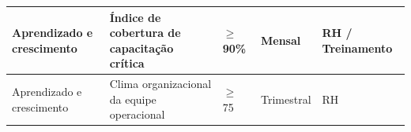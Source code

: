 \begin{table}[htbp]
\begin{tabular}{|p{3cm}|p{3cm}|p{2cm}|p{2cm}|p{3cm}|}
 \hline                                                                         
 Aprendizado e crescimento & Índice de cobertura de capacitação crítica &       
 $\geq$ 90\% & Mensal & RH / Treinamento \\                                       
 \hline                                                                         
 Aprendizado e crescimento & Clima organizacional da equipe operacional &       
 $\geq$ 75 & Trimestral & RH \\                                                 
 \hline                                                                         
 \end{tabular}                                                                  
 \end{table}                                                                    
